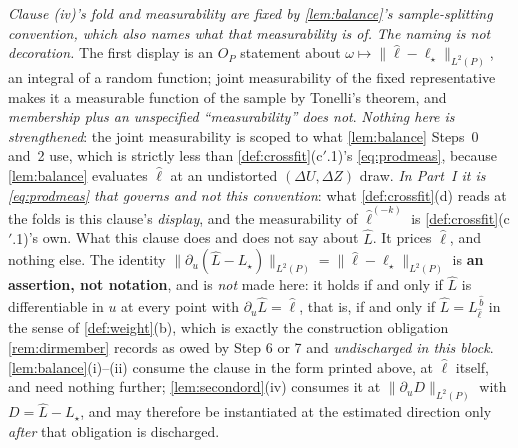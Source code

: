 \medskip
\noindent
\emph{Clause \textup{(iv)}'s fold and measurability are fixed by \cref{lem:balance}'s sample-splitting
convention, which also names what that measurability is \emph{of}.} \emph{The naming is not decoration.}
The
first display is an $O_P$ statement about $\omega\mapsto\|\hat\ell-\ell_\star\|_{L^{2}(P)}$, an integral of
a random function; joint measurability of the fixed representative makes it a measurable function of the
sample by Tonelli's theorem, and \emph{membership plus an unspecified ``measurability'' does not}.
\emph{Nothing here is strengthened}: the joint measurability
is scoped to what \cref{lem:balance} Steps~0 and~2 use, which is strictly less than
\cref{def:crossfit}\textup{(c$'$.1)}'s \eqref{eq:prodmeas}, because \cref{lem:balance} evaluates $\hat\ell$
at an undistorted $(\Delta U,\Delta Z)$ draw. \emph{In Part~I it is \eqref{eq:prodmeas} that governs and
not this convention}: what \cref{def:crossfit}\textup{(d)} reads at the folds is this clause's
\emph{display}, and the measurability of $\hat\ell^{(-k)}$ is \cref{def:crossfit}\textup{(c$'$.1)}'s own.
What this clause does and does not say about $\hat L$. It prices
$\hat\ell$, and nothing else. The identity
$\|\partial_u(\hat L-L_\star)\|_{L^{2}(P)}=\|\hat\ell-\ell_\star\|_{L^{2}(P)}$ is \textbf{an assertion,
not notation}, and is \emph{not} made here: it holds if and only if $\hat L$ is differentiable in $u$ at
every point with $\partial_u\hat L=\hat\ell$, that is, if and only if $\hat L=L^{\,\hat b}_{\hat\ell}$ in
the sense of \cref{def:weight}(b), which is exactly the construction obligation \cref{rem:dirmember}
records as owed by Step 6 or 7 and \emph{undischarged in this block}. \cref{lem:balance}(i)--(ii) consume
the clause in the form printed above, at $\hat\ell$ itself, and need nothing further;
\cref{lem:secondord}(iv) consumes it at $\|\partial_uD\|_{L^{2}(P)}$ with $D=\hat L-L_\star$, and may
therefore be instantiated at the estimated direction only \emph{after} that obligation is discharged.

